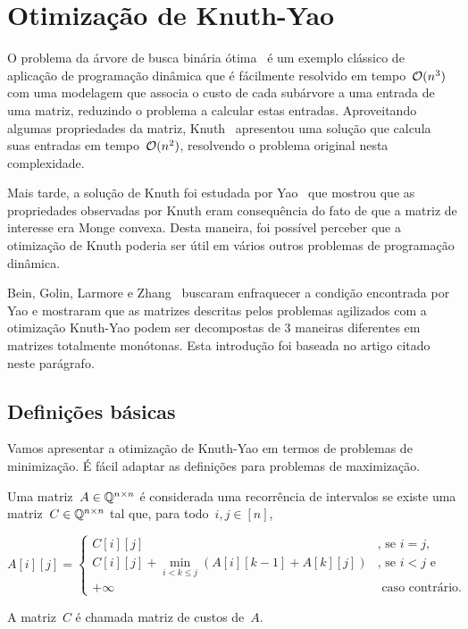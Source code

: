 \section{Otimização de Knuth-Yao}
\label{KY}


O problema da árvore de busca binária ótima~\cite{CLRS} é um exemplo clássico de aplicação de programação dinâmica que é fácilmente resolvido em tempo~$\mathcal{O}(n^3)$ com uma modelagem que associa o custo de cada subárvore a uma entrada de uma matriz, reduzindo o problema a calcular estas entradas. Aproveitando algumas propriedades da matriz, Knuth~\cite{Knuth:1971} apresentou uma solução que calcula suas entradas em tempo~$\mathcal{O}(n^2)$, resolvendo o problema original nesta complexidade.

Mais tarde, a solução de Knuth foi estudada por Yao~\cite{Yao:1980,Yao:1982} que mostrou que as propriedades observadas por Knuth eram consequência do fato de que a matriz de interesse era Monge convexa. Desta maneira, foi possível perceber que a otimização de Knuth poderia ser útil em vários outros problemas de programação dinâmica. 

Bein, Golin, Larmore e Zhang~\cite{Bein:2009} buscaram enfraquecer a condição encontrada por Yao e mostraram que as matrizes descritas pelos problemas agilizados com a otimização Knuth-Yao podem ser decompostas de 3 maneiras diferentes em matrizes totalmente monótonas. Esta introdução foi baseada no artigo citado neste parágrafo.


\subsection{Definições básicas} \label{KY:defs}

Vamos apresentar a otimização de Knuth-Yao em termos de problemas de minimização. É fácil adaptar as definições para problemas de maximização.

\begin{defi}
Uma matriz~$A \in \mathbb{Q}^{n \times n}$ é considerada uma recorrência de intervalos se existe uma matriz~$C \in \mathbb{Q}^{n \times n}$ tal que, para todo~$i,j \in [n]$,

\begin{equation*}
A[i][j] = \begin{cases}
C[i][j]                                                           & \text{, se } i = j \text{, }  \\
C[i][j] + \min\limits_{i < k \leq j}(A[i][k-1] + A[k][j])         & \text{, se } i < j \text{ e } \\
+\infty                                                           & \text{ caso contrário. }
\end{cases}
\end{equation*}

A matriz~$C$ é chamada matriz de custos de~$A$.
\end{defi}

